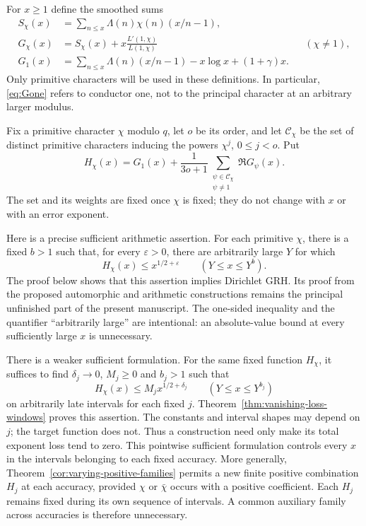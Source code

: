 For $x\ge1$ define the smoothed sums
\begin{align}
 S_\chi(x)&=\sum_{n\le x}\Lambda(n)\chi(n)(x/n-1),\label{eq:Schi}\\
 G_\chi(x)&=S_\chi(x)+x\frac{L'(1,\chi)}{L(1,\chi)}
                  &&(\chi\ne1),\label{eq:Gchi}\\
 G_1(x)&=\sum_{n\le x}\Lambda(n)(x/n-1)
          -x\log x+(1+\gamma)x.\label{eq:Gone}
\end{align}
Only primitive characters will be used in these definitions. In
particular, \eqref{eq:Gone} refers to conductor one, not to the
principal character at an arbitrary larger modulus.

Fix a primitive character $\chi$ modulo $q$, let $o$ be its order, and
let $\mathcal C_\chi$ be the set of distinct primitive characters
inducing the powers $\chi^j$, $0\le j<o$. Put
\begin{equation}\label{eq:Hchi}
 H_\chi(x)=G_1(x)+\frac1{3o+1}
       \sum_{\substack{\psi\in\mathcal C_\chi\\\psi\ne1}}
               \Re G_\psi(x).
\end{equation}
The set and its weights are fixed once $\chi$ is fixed; they do not
change with $x$ or with an error exponent.

Here is a precise sufficient arithmetic assertion. For each primitive
$\chi$, there is a fixed $b>1$ such that, for every $\varepsilon>0$,
there are arbitrarily large $Y$ for which
\begin{equation}\label{eq:remaining-estimate}
             H_\chi(x)\le x^{1/2+\varepsilon}
                    \qquad(Y\le x\le Y^b).
\end{equation}
The proof below shows that this assertion implies Dirichlet GRH.
Its proof from the proposed automorphic and arithmetic constructions
remains the principal unfinished part of the present manuscript.
The one-sided inequality and the quantifier ``arbitrarily large'' are
intentional: an absolute-value bound at every sufficiently large $x$
is unnecessary.

There is a weaker sufficient formulation.  For the same fixed function
$H_\chi$, it suffices to find $\delta_j\to0$, $M_j\geq0$ and $b_j>1$
such that
\[
 H_\chi(x)\leq M_jx^{1/2+\delta_j}
       \qquad(Y\leq x\leq Y^{b_j})
\]
on arbitrarily late intervals for each fixed $j$.
Theorem~\ref{thm:vanishing-loss-windows} proves this assertion.
The constants and interval shapes may depend on $j$; the target
function does not. Thus a construction need only make its total exponent
loss tend to zero. This pointwise sufficient formulation controls every
$x$ in the intervals belonging to each fixed accuracy. More generally,
Theorem~\ref{cor:varying-positive-families} permits a new finite positive
combination $H_j$ at each accuracy, provided $\chi$ or $\bar\chi$ occurs
with a positive coefficient. Each $H_j$ remains fixed during its own
sequence of intervals. A common auxiliary family across accuracies is
therefore unnecessary.

